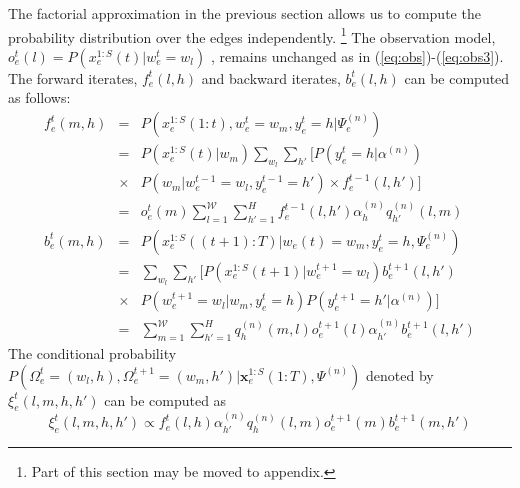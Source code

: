 \documentclass{bioinfo}
\begin{document}
\begin{methods}
The factorial approximation in the previous section allows us to
compute the probability distribution over the edges independently.
\footnote{Part of this section may be moved to appendix.}
The observation model, $o^t_e(l)=P(x^{1:S}_e(t) | w^t_e=w_l)$ , remains unchanged as in
(\ref{eq:obs})-(\ref{eq:obs3}). 
The forward iterates, $f_e^t(l, h)$ and backward iterates, $b_e^t(l,
h)$ can  be computed as follows: 
\begin{eqnarray}
  \label{eq:mixture-update}
  f^{t}_{e}(m, h) &=& P(x_{e}^{1:S}(1:t) , w_{e}^{t} = w_{m},
  y_e^t = h | \Psi^{(n)}_{e}) \\
&=& P(x^{1:S}_e(t) | w_m) \sum_{w_l} \sum_{h'}
\Big[ P(y^t_e=h | \alpha^{(n)})  \nonumber \\
&\times& P(w_m | w^{t-1}_e = w_l, y^{t-1}_e = h')  \times f_e^{t-1}(l, h')
\Big]\\
&=& o^{t}_{e}(m) \sum_{l=1}^{{\mathcal W}} \sum_{h'=1}^H
f_{e}^{t-1}(l, h') \alpha_h^{(n)} q_{h'}^{(n)}(l, m) \\
  b^{t}_{e}(m, h) &=& P(x^{1:S}_{e}((t+1):T) | w_{e}(t) = w_{m}, y_e^{t}=h,
  \Psi^{(n)}_{e})  \\
&=&  \sum_{w_l} \sum_{h'} \Big[ P(x^{1:S}_e(t+1) | w^{t+1}_e = w_l)
  b_e^{t+1}(l, h')\nonumber \\
&\times& P(w^{t+1}_e = w_l | w_m, y^{t}_e = h)   P(y^{t+1}_e=h' | \alpha^{(n)}) 
\Big]\\
\label{eq:mixture-update-1}
&=& \sum_{m=1}^{{\mathcal W}}\sum_{h'=1}^H q_{h}^{(n)}(m, l) o^{t+1}_{e}(l) \alpha^{(n)}_{h'}b^{t+1}_{e}(l,h')
\end{eqnarray}
The conditional probability $P(\Omega_e^{t}=(w_l, h), \Omega_e^{t+1}
=(w_m, h') | \mathbf{x}_e^{1:S}(1:T) , \Psi^{(n)})$ denoted by $\xi^t_e(l,m,h,h') $ can be computed as
\begin{equation}
  \label{eq:mixture-p-cond}
  \xi^t_e(l,m,h,h') \propto f^t_e(l,h)\alpha_{h'}^{(n)} q^{(n)}_h(l,m)
  o^{t+1}_e(m) b_e^{t+1}(m, h')

\end{equation}
\end{methods}
\end{document}
